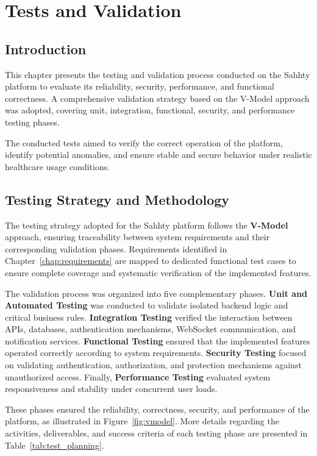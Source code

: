 \chapter{Tests and Validation}
\label{chap:Fire}

\section{Introduction}

This chapter presents the testing and validation process conducted on the Sahhty platform to evaluate its reliability, security, performance, and functional correctness. A comprehensive validation strategy based on the V-Model approach was adopted, covering unit, integration, functional, security, and performance testing phases.

The conducted tests aimed to verify the correct operation of the platform, identify potential anomalies, and ensure stable and secure behavior under realistic healthcare usage conditions.
\section{Testing Strategy and Methodology}
The testing strategy adopted for the Sahhty platform follows the \textbf{V-Model} approach, ensuring traceability between system requirements and their corresponding validation phases. Requirements identified in Chapter~\ref{chap:requirements} are mapped to dedicated functional test cases to ensure complete coverage and systematic verification of the implemented features.

The validation process was organized into five complementary phases. \textbf{Unit and Automated Testing} was conducted to validate isolated backend logic and critical business rules. \textbf{Integration Testing} verified the interaction between APIs, databases, authentication mechanisms, WebSocket communication, and notification services. \textbf{Functional Testing} ensured that the implemented features operated correctly according to system requirements. \textbf{Security Testing} focused on validating authentication, authorization, and protection mechanisms against unauthorized access. Finally, \textbf{Performance Testing} evaluated system responsiveness and stability under concurrent user loads.

These phases ensured the reliability, correctness, security, and performance of the platform, as illustrated in Figure~\ref{fig:vmodel}. More details regarding the activities, deliverables, and success criteria of each testing phase are presented in Table~\ref{tab:test_planning}.

